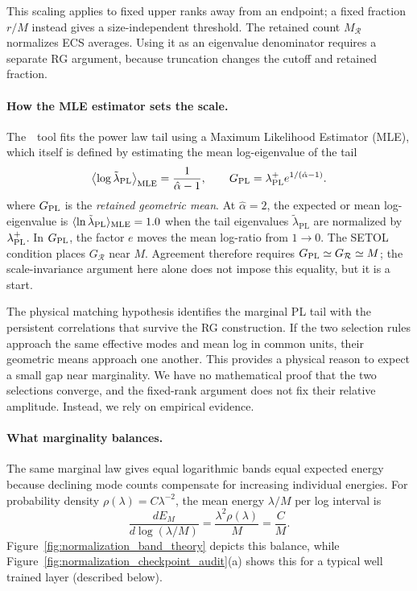 This scaling applies to fixed upper ranks away from an endpoint;
a fixed fraction $r/M$ instead gives a size-independent threshold.
The retained count $M_{\mathcal R}$ normalizes ECS averages.
Using it as an eigenvalue denominator requires a separate RG argument,
because truncation changes the cutoff and retained fraction.

\ifdefined\RGTheoryColumnBreak\RGTheoryColumnBreak\fi
\paragraph{How the MLE estimator sets the scale.}
The~\WW~tool fits the power law tail using a Maximum Likelihood Estimator (MLE),
which itself is defined by estimating the mean log-eigenvalue of the tail
\begin{equation}
\left\langle\log\tilde{\lambda}_{\mathrm{PL}}\right\rangle_{\rm MLE}=\frac{1}{\hat\alpha-1},
\qquad
G_{\rm PL}=\lambda^{+}_{\rm PL} e^{1/(\hat\alpha-1)}.
\label{eq:mle_logmean_bridge}
\end{equation}
where $G_{\rm PL}$ is the \emph{retained geometric mean}.
At $\hat\alpha=2$, the expected or mean log-eigenvalue is
$\langle \ln \tilde{\lambda}_{\mathrm{PL}}\rangle_{\rm MLE}=1.0$ when
the tail eigenvalues $\tilde{\lambda}_{\mathrm{PL}}$ are normalized by $\lambda^{+}_{\rm PL}$.
In $G_{\rm PL}$, the factor $e$ moves the mean log-ratio from $1\rightarrow 0$.
The SETOL condition places $G_{\mathcal R}$ near $M$.
Agreement therefore requires $G_{\rm PL}\simeq G_{\mathcal R}\simeq M$;
the scale-invariance argument here alone does not impose this equality,
but it is a start.

The physical matching hypothesis identifies the marginal PL tail with
the persistent correlations that survive the RG construction.
If the two selection rules approach the same effective modes and mean
log in common units, their geometric means approach one another.
This provides a physical reason to expect a small gap near marginality.
We have no mathematical proof that the two selections converge,
and the fixed-rank argument does not fix their relative amplitude.
Instead, we rely on empirical evidence.

\paragraph{What marginality balances.}
The same marginal law gives equal logarithmic bands equal expected
energy because declining mode counts compensate for increasing
individual energies.
For probability density $\rho(\lambda)=C\lambda^{-2}$, the mean
energy $\lambda/M$ per log interval is
\begin{equation}
\frac{dE_M}{d\log(\lambda/M)}
=\frac{\lambda^2\rho(\lambda)}{M}=\frac CM.
\label{eq:energy_per_log_band}
\end{equation}
Figure~\ref{fig:normalization_band_theory} depicts this balance,
while Figure~\ref{fig:normalization_checkpoint_audit}(a) shows
this for a typical well trained layer (described below).

